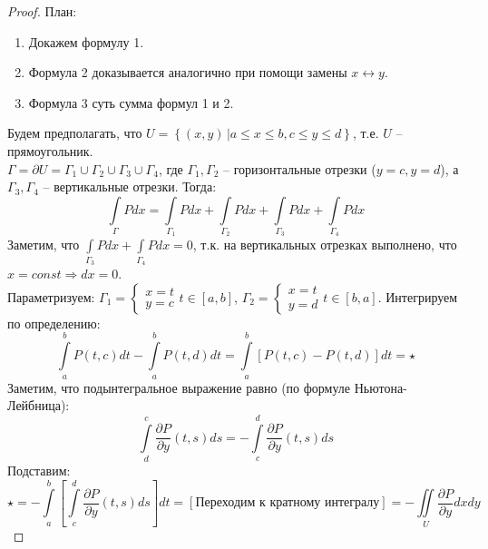 \begin{statement}
    \begin{proof}
        План:
        \begin{enumerate}
            \item Докажем формулу 1.
            \item Формула 2 доказывается аналогично при помощи замены $x \leftrightarrow y$.
            \item Формула 3 суть сумма формул 1 и 2.
        \end{enumerate}
        Будем предполагать, что $U = \left\{ (x, y) \, | a \leqslant x \leqslant b, c \leqslant y \leqslant d \right\}$,
        т.е. $U$ -- прямоугольник.\\
        $\Gamma = \partial U = \Gamma_1 \cup \Gamma_2 \cup \Gamma_3 \cup \Gamma_4$, где $\Gamma_1, \Gamma_2$ -- горизонтальные отрезки ($y = c, y = d$),
        а $\Gamma_3, \Gamma_4$ -- вертикальные отрезки. Тогда:
        \[
            \int\limits_{\Gamma} Pdx =
            \int\limits_{\Gamma_1} Pdx + \int\limits_{\Gamma_2} Pdx + \int\limits_{\Gamma_3} Pdx + \int\limits_{\Gamma_4} Pdx
        \]
        Заметим, что $\int\limits_{\Gamma_3} Pdx + \int\limits_{\Gamma_4} Pdx = 0$,
        т.к. на вертикальных отрезках выполнено, что $x = const \Rightarrow dx = 0$.\\
        Параметризуем: $\Gamma_1 = \begin{cases} x = t\\ y = c\end{cases} t \in [a, b]$, $\Gamma_2 = \begin{cases} x = t\\ y = d\end{cases} t \in [b, a]$.
        Интегрируем по определению:
        \[
            \int\limits_{a}^{b} P(t, c)dt - \int\limits_{a}^{b} P(t, d)dt =
            \int\limits_{a}^{b} \left[P(t, c) - P(t, d) \right] dt = \star
        \]
        Заметим, что подынтегральное выражение равно (по формуле Ньютона-Лейбница):
        \[
            \int\limits_{d}^{c} \frac{\partial P}{\partial y}(t, s)ds =
            -\int\limits_{c}^{d} \frac{\partial P}{\partial y}(t, s)ds
        \]
        Подставим:
        \[
            \star = -\int\limits_a^b \left[\int\limits_{c}^{d} \frac{\partial P}{\partial y}(t, s)ds \right]dt = [\text{Переходим к кратному интегралу}] =
            -\iint\limits_{U} \frac{\partial P}{\partial y}dxdy
        \]
    \end{proof}
\end{statement}